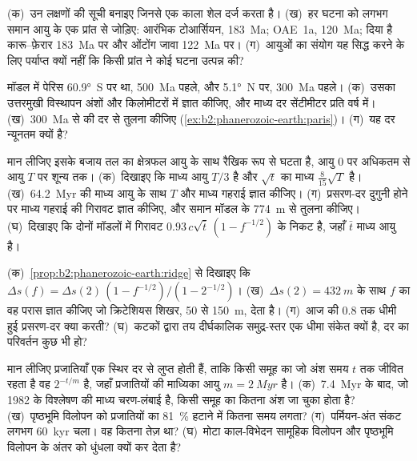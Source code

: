 \begin{exercise}[$\star\star$]\label{exo:b2:phanerozoic-earth:8}
(क)~उन लक्षणों की सूची बनाइए जिनसे एक काला शेल  दर्ज करता है। (ख)~हर
घटना को लगभग समान आयु के एक प्रांत से जोड़िए: आरंभिक टोआर्सियन, \qty{183}{Ma}; OAE~1a,
\qty{120}{Ma}; दिया है कारू--फ़ेरार \qty{183}{Ma} पर और ओंटोंग जावा \qty{122}{Ma} पर। (ग)~आयुओं का
संयोग यह सिद्ध करने के लिए पर्याप्त क्यों नहीं कि किसी प्रांत ने कोई घटना उत्पन्न की?
\end{exercise}

\begin{exercise}[$\star\star$]\label{exo:b2:phanerozoic-earth:9}
मॉडल में पेरिस \ang{60.9}~S पर था, \qty{500}{Ma} पहले, और \ang{5.1}~N पर, \qty{300}{Ma} पहले।
(क)~उसका उत्तरमुखी विस्थापन अंशों और किलोमीटरों में ज्ञात कीजिए, और माध्य दर
सेंटीमीटर प्रति वर्ष में। (ख)~\qty{300}{Ma} से की दर से तुलना कीजिए
(\cref{ex:b2:phanerozoic-earth:paris})। (ग)~यह दर न्यूनतम क्यों है?
\end{exercise}

\begin{exercise}[$\star\star\star$]\label{exo:b2:phanerozoic-earth:10}
मान लीजिए इसके बजाय तल का क्षेत्रफल आयु के साथ रैखिक रूप से घटता है, आयु 0 पर अधिकतम से आयु $T$ पर
शून्य तक। (क)~दिखाइए कि माध्य आयु $T/3$ है और $\sqrt t$ का माध्य
$\tfrac{8}{15}\sqrt T$ है। (ख)~\qty{64.2}{Myr} की माध्य आयु के साथ $T$ और माध्य गहराई ज्ञात कीजिए। (ग)~प्रसरण-दर
दुगुनी होने पर माध्य गहराई की गिरावट ज्ञात कीजिए, और समान मॉडल के
\qty{774}{m} से तुलना कीजिए। (घ)~दिखाइए कि दोनों मॉडलों में गिरावट $0.93\,c\sqrt{\bar
t}\,(1 - f^{-1/2})$ के निकट है, जहाँ $\bar t$ माध्य आयु है।
\end{exercise}

\begin{exercise}[$\star\star\star$]\label{exo:b2:phanerozoic-earth:11}
(क)~\cref{prop:b2:phanerozoic-earth:ridge} से दिखाइए कि $\Delta s(f) = \Delta s(2)\,(1 -
f^{-1/2})/(1 - 2^{-1/2})$। (ख)~$\Delta s(2) = \qty{432}{m}$ के साथ $f$ का वह परास ज्ञात कीजिए जो
क्रिटेशियस शिखर, 50 से \qty{150}{m}, देता है। (ग)~आज की 0.8 तक धीमी हुई प्रसरण-दर
क्या करती? (घ)~कटकों द्वारा तय दीर्घकालिक समुद्र-स्तर एक धीमा संकेत क्यों है, दर का परिवर्तन
कुछ भी हो?
\end{exercise}

\begin{exercise}[$\star\star\star$]\label{exo:b2:phanerozoic-earth:12}
मान लीजिए प्रजातियाँ एक स्थिर दर से लुप्त होती हैं, ताकि किसी समूह का जो अंश समय $t$ तक जीवित रहता है
वह $2^{-t/m}$ है, जहाँ प्रजातियों की माध्यिका आयु $m = \qty{2}{Myr}$ है। (क)~\qty{7.4}{Myr} के बाद, जो 1982 के विश्लेषण की माध्य चरण-लंबाई है,
किसी समूह का कितना अंश जा चुका होता है? (ख)~पृष्ठभूमि विलोपन को
प्रजातियों का \qty{81}{\percent} हटाने में कितना समय लगता? (ग)~पर्मियन-अंत संकट लगभग
\qty{60}{kyr} चला। वह कितना तेज़ था? (घ)~मोटा काल-विभेदन सामूहिक विलोपन
और पृष्ठभूमि विलोपन के अंतर को धुंधला क्यों कर देता है?
\end{exercise}

